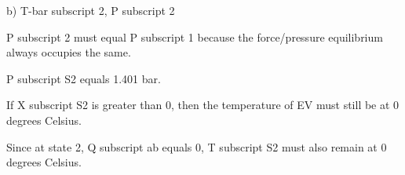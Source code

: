 b) T-bar subscript 2, P subscript 2

P subscript 2 must equal P subscript 1 because the force/pressure equilibrium always occupies the same.

P subscript S2 equals 1.401 bar.

If X subscript S2 is greater than 0, then the temperature of EV must still be at 0 degrees Celsius.

Since at state 2, Q subscript ab equals 0, T subscript S2 must also remain at 0 degrees Celsius.